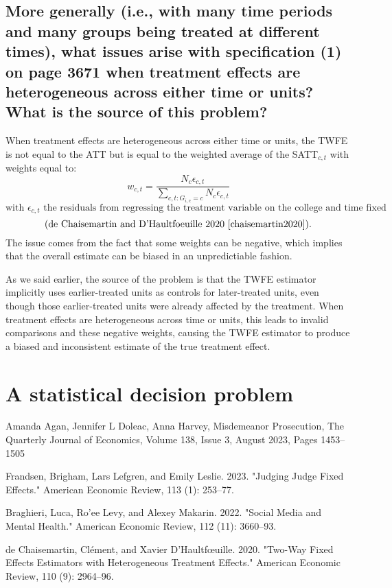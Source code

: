 \documentclass{article}
\begin{document}
\subsection{More generally (i.e., with many time periods and many groups being treated at different times), what issues arise with specification (1) on page 3671 when treatment effects are heterogeneous across either time or units? What is the source of this problem?}

When treatment effects are heterogeneous across either time or units, the TWFE is not equal to the ATT but is equal to the weighted average of the SATT\(_{c,t}\) with weights equal to:
\[w_{c,t}=\frac{N_c \epsilon_{c,t}}{ \sum_{c,t:G_{i,c}=c}N_c \epsilon_{c,t}}\] 
\[\text{with } \epsilon_{c,t} \text{ the residuals from regressing the treatment variable on the college and time fixed effects}\]
\[\text{(de Chaisemartin and D'Haultfoeuille 2020 \cite{chaisemartin2020}).}\]
The issue comes from the fact that some weights can be negative, which implies that the overall estimate can be biased in an unpredictiable fashion.

As we said earlier, the source of the problem is that the TWFE estimator implicitly uses earlier-treated units as controls for later-treated units, even though those earlier-treated units were already affected by the treatment. When treatment effects are heterogeneous across time or units, this leads to invalid comparisons and these negative weights, causing the TWFE estimator to produce a biased and inconsistent estimate of the true treatment effect.


\section{A statistical decision problem}




\begin{thebibliography}{9}

Amanda Agan, Jennifer L Doleac, Anna Harvey, Misdemeanor Prosecution, The Quarterly Journal of Economics, Volume 138, Issue 3, August 2023, Pages 1453–1505

Frandsen, Brigham, Lars Lefgren, and Emily Leslie. 2023. "Judging Judge Fixed Effects." American Economic Review, 113 (1): 253–77.

Braghieri, Luca, Ro'ee Levy, and Alexey Makarin. 2022. "Social Media and Mental Health." American Economic Review, 112 (11): 3660–93.

de Chaisemartin, Clément, and Xavier D'Haultfœuille. 2020. "Two-Way Fixed Effects Estimators with Heterogeneous Treatment Effects." American Economic Review, 110 (9): 2964–96.

\end{thebibliography}
\end{document}
